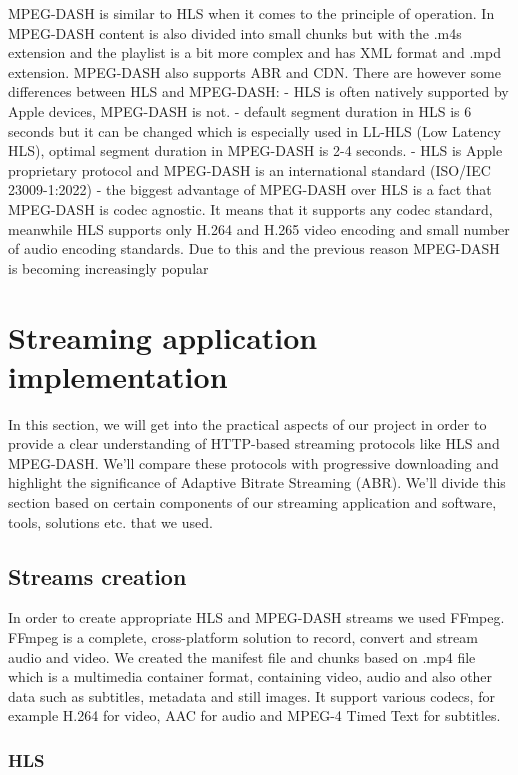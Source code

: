 \documentclass{article}
\begin{document}
MPEG-DASH is similar to HLS when it comes to the principle of operation.
In MPEG-DASH content is also divided into small chunks but with the .m4s
extension and the playlist is a bit more complex and has XML format and
.mpd extension. MPEG-DASH also supports ABR and CDN. There are however
some differences between HLS and MPEG-DASH: - HLS is often natively
supported by Apple devices, MPEG-DASH is not. - default segment duration
in HLS is 6 seconds but it can be changed which is especially used in
LL-HLS (Low Latency HLS), optimal segment duration in MPEG-DASH is 2-4
seconds. - HLS is Apple proprietary protocol and MPEG-DASH is an
international standard (ISO/IEC 23009-1:2022) - the biggest advantage of
MPEG-DASH over HLS is a fact that MPEG-DASH is codec agnostic. It means
that it supports any codec standard, meanwhile HLS supports only H.264
and H.265 video encoding and small number of audio encoding standards.
Due to this and the previous reason MPEG-DASH is becoming increasingly
popular

\section{Streaming application
implementation}\label{streaming-application-implementation}

In this section, we will get into the practical aspects of our project
in order to provide a clear understanding of HTTP-based streaming protocols
like HLS and MPEG-DASH. We'll compare these protocols with progressive
downloading and highlight the significance of Adaptive Bitrate Streaming
(ABR). We'll divide this section based on certain components of our
streaming application and software, tools, solutions etc. that we used.

\subsection{Streams creation}\label{streams-creation}

In order to create appropriate HLS and MPEG-DASH streams we used FFmpeg.
FFmpeg is a complete, cross-platform solution to record, convert and
stream audio and video. We created the manifest file and chunks based on
.mp4 file which is a multimedia container format, containing video,
audio and also other data such as subtitles, metadata and still images.
It support various codecs, for example H.264 for video, AAC for audio
and MPEG-4 Timed Text for subtitles.

\subsubsection{HLS}\label{hls-1}
\end{document}
